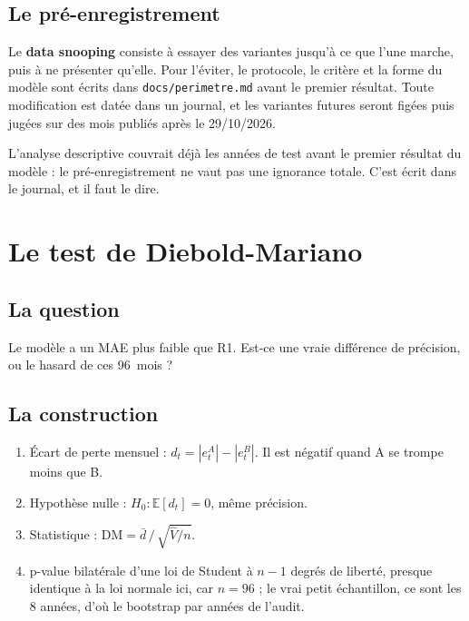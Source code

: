 \documentclass[11pt,a4paper]{article}
\newcommand{\code}[1]{\texttt{\small #1}}
\newcounter{qr}
\begin{document}
\subsection{Le pré-enregistrement}

Le \textbf{data snooping} consiste à essayer des variantes jusqu'à ce que l'une marche, puis à ne présenter qu'elle. Pour l'éviter, le protocole, le critère et la forme du modèle sont écrits dans
\code{docs/perimetre.md} avant le premier résultat. Toute modification est datée dans un journal, et les variantes futures seront figées puis jugées sur des mois publiés après le 29/10/2026.

\begin{attention}
L'analyse descriptive couvrait déjà les années de test avant le premier résultat du modèle : le pré-enregistrement ne vaut pas une ignorance totale. C'est écrit dans le journal, et il faut le dire.
\end{attention}

\section{Le test de Diebold-Mariano}

\subsection{La question}

Le modèle a un MAE plus faible que R1. Est-ce une vraie différence de précision, ou le hasard de ces 96~mois ?

\subsection{La construction}

\begin{enumerate}
\item Écart de perte mensuel : $d_t = |e^{A}_t| - |e^{B}_t|$. Il est négatif quand A se trompe moins que B.
\item Hypothèse nulle : $H_0 : \mathbb{E}[d_t] = 0$, même précision.
\item Statistique : $\mathrm{DM} = \bar d \,/\, \sqrt{\hat V / n}$.
\item p-value bilatérale d'une loi de Student à $n-1$ degrés de liberté, presque identique à la loi normale ici, car $n = 96$ ; le vrai petit échantillon, ce sont les 8 années, d'où le bootstrap par années de l'audit.
\end{enumerate}
\end{document}
